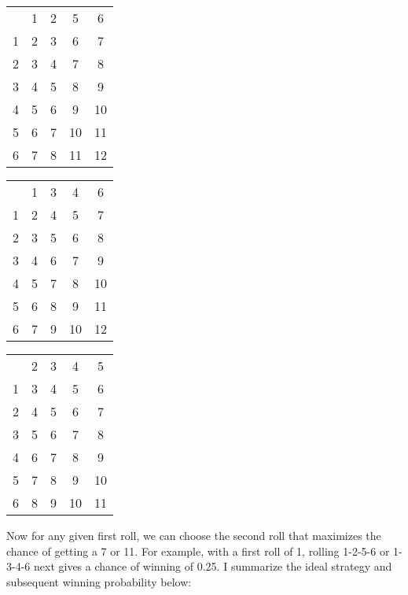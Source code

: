 \documentclass{article}
\begin{document}
\vspace{0.1in}

\begin{center}
\begin{tabular}{ c|c|c|c|c| }
\multicolumn{1}{c}{} & \multicolumn{1}{c}{1} & \multicolumn{1}{c}{2} & \multicolumn{1}{c}{5} & \multicolumn{1}{c}{6} \\
\cline{2-5}
1 & 2 & 3 & 6  & 7 \\
\cline{2-5}
2 & 3 & 4 & 7  & 8 \\
\cline{2-5}
3 & 4 & 5 & 8  & 9 \\
\cline{2-5}
4 & 5 & 6 & 9  & 10 \\
\cline{2-5}
5 & 6 & 7 & 10 & 11 \\
\cline{2-5}
6 & 7 & 8 & 11 & 12 \\
\cline{2-5}
\end{tabular}
\qquad
\begin{tabular}{ c|c|c|c|c| }
\multicolumn{1}{c}{} & \multicolumn{1}{c}{1} & \multicolumn{1}{c}{3} & \multicolumn{1}{c}{4} & \multicolumn{1}{c}{6} \\
\cline{2-5}
1 & 2 & 4 & 5  & 7 \\
\cline{2-5}
2 & 3 & 5 & 6  & 8 \\
\cline{2-5}
3 & 4 & 6 & 7  & 9 \\
\cline{2-5}
4 & 5 & 7 & 8  & 10 \\
\cline{2-5}
5 & 6 & 8 & 9  & 11 \\
\cline{2-5}
6 & 7 & 9 & 10 & 12 \\
\cline{2-5}
\end{tabular}
\qquad
\begin{tabular}{ c|c|c|c|c| }
\multicolumn{1}{c}{} & \multicolumn{1}{c}{2} & \multicolumn{1}{c}{3} & \multicolumn{1}{c}{4} & \multicolumn{1}{c}{5} \\
\cline{2-5}
1 & 3 & 4 & 5  & 6 \\
\cline{2-5}
2 & 4 & 5 & 6  & 7 \\
\cline{2-5}
3 & 5 & 6 & 7  & 8 \\
\cline{2-5}
4 & 6 & 7 & 8  & 9 \\
\cline{2-5}
5 & 7 & 8 & 9  & 10 \\
\cline{2-5}
6 & 8 & 9 & 10 & 11 \\
\cline{2-5}
\end{tabular}
\end{center}

\vspace{0.1in}

Now for any given first roll, we can choose the second roll that maximizes the chance of getting a 7 or 11.
For example, with a first roll of 1, rolling 1-2-5-6 or 1-3-4-6 next gives a chance of winning of 0.25.
I summarize the ideal strategy and subsequent winning probability below:
\end{document}
